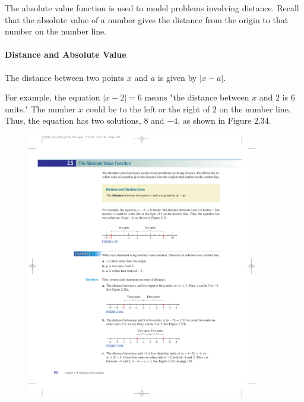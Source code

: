 \documentclass[10pt,]{book}
\theoremstyle{plain}
\theoremstyle{definition}
\theoremstyle{definition}
\theoremstyle{definition}
\theoremstyle{definition}
\theoremstyle{definition}
\numberwithin{equation}{section}
\newcommand\abs[1]{\left|#1\right|}
\begin{document}
    The absolute value function is used to model problems involving distance. Recall that the absolute value of a number gives the distance from the origin to that number on the number line.
%
\typeout{************************************************}
\typeout{************************************************}
\paragraph[Distance and Absolute Value]{Distance and Absolute Value}\label{paragraphs-30}
%
\par
The distance between two points \(x\) and \(a\) is given by \(\abs{x − a}\).%
\par

    For example, the equation \(\abs{x − 2} = 6\) means "the distance between \(x\) and \(2\) is \(6\) units." The number \(x\) could be to the left or the right of \(2\) on the number line. Thus, the equation has two solutions, \(8\) and \(−4\), as shown in Figure 2.34.
%
\leavevmode%
\begin{figure}
\centering
\includegraphics[width=0.90\textwidth,]{images/fig-abs-x-minus-2-is-6.pdf}\caption{\label{fig-abs-x-minus-2-is-6}}
\end{figure}
\end{document}
